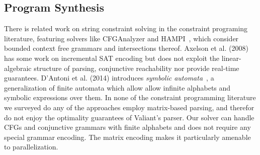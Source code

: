 \documentclass[sigplan,review,anonymous,acmsmall]{acmart}\settopmatter{printfolios=false,printccs=false,printacmref=false}
\begin{document}

%

\subsection{Program Synthesis}

There is related work on string constraint solving in the constraint programing literature, featuring solvers like CFGAnalyzer and HAMPI~\cite{kiezun2009hampi}, which consider bounded context free grammars and intersections thereof. Axelson et al. (2008)~\cite{axelsson2008analyzing} has some work on incremental SAT encoding but does not exploit the linear-algebraic structure of parsing, conjunctive reachability nor provide real-time guarantees. D'Antoni et al. (2014) introduces \textit{symbolic automata}~\cite{dantoni2014minimization}, a generalization of finite automata which allow allow infinite alphabets and symbolic expressions over them. In none of the constraint programming literature we surveyed do any of the approaches employ matrix-based parsing, and therefor do not enjoy the optimality guarantees of Valiant's parser. Our solver can handle CFGs and conjunctive grammars with finite alphabets and does not require any special grammar encoding. The matrix encoding makes it particularly amenable to parallelization.
\end{document}
